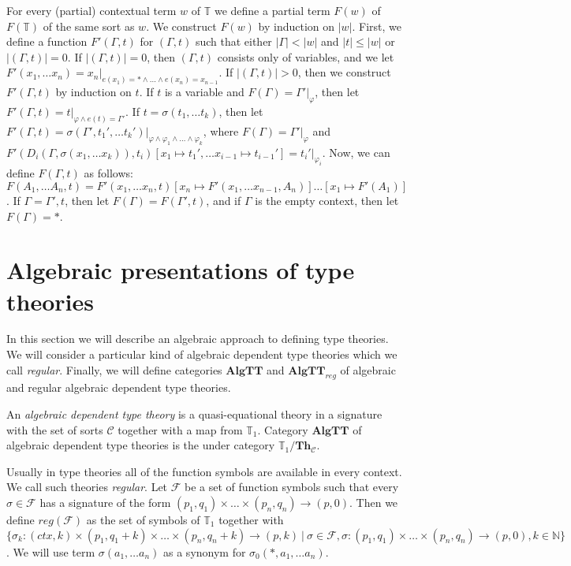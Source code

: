 \documentclass[reqno]{amsart}
\theoremstyle{definition}
\theoremstyle{remark}
\newcommand{\cat}[1]{\mathbf{#1}}
\newcommand{\algtt}{\cat{AlgTT}}
\numberwithin{figure}{section}
\begin{document}
For every (partial) contextual term $w$ of $\mathbb{T}$ we define a partial term $F(w)$ of $F(\mathbb{T})$ of the same sort as $w$.
We construct $F(w)$ by induction on $|w|$.
First, we define a function $F'(\Gamma,t)$ for $(\Gamma,t)$ such that either $|\Gamma| < |w|$ and $|t| \leq |w|$ or $|(\Gamma,t)| = 0$.
If $|(\Gamma,t)| = 0$, then $(\Gamma,t)$ consists only of variables, and we let $F'(x_1, \ldots x_n) = x_n|_{e(x_1) = * \land \ldots \land e(x_n) = x_{n-1}}$.
If $|(\Gamma,t)| > 0$, then we construct $F'(\Gamma,t)$ by induction on $t$.
If $t$ is a variable and $F(\Gamma) = \Gamma'|_\varphi$, then let $F'(\Gamma,t) = t|_{\varphi \land e(t) = \Gamma'}$.
If $t = \sigma(t_1, \ldots t_k)$, then let $F'(\Gamma,t) = \sigma(\Gamma', t_1', \ldots t_k')|_{\varphi \land \varphi_1 \land \ldots \land \varphi_k}$,
    where $F(\Gamma) = \Gamma'|_\varphi$ and $F'(D_i(\Gamma,\sigma(x_1, \ldots x_k)), t_i)[x_1 \mapsto t_1', \ldots x_{i-1} \mapsto t_{i-1}'] = t_i'|_{\varphi_i}$.
Now, we can define $F(\Gamma,t)$ as follows: $F(A_1, \ldots A_n, t) = F'(x_1, \ldots x_n, t)[x_n \mapsto F'(x_1, \ldots x_{n-1}, A_n)] \ldots \allowbreak [x_1 \mapsto F'(A_1)]$.
If $\Gamma = \Gamma',t$, then let $F(\Gamma) = F(\Gamma',t)$, and if $\Gamma$ is the empty context, then let $F(\Gamma) = *$.

\section{Algebraic presentations of type theories}

In this section we will describe an algebraic approach to defining type theories.
We will consider a particular kind of algebraic dependent type theories which we call \emph{regular}.
Finally, we will define categories $\algtt$ and $\algtt_{reg}$ of algebraic and regular algebraic dependent type theories.

\begin{defn}
An \emph{algebraic dependent type theory} is a quasi-equational theory in a signature with the set of sorts $\mathcal{C}$ together with a map from $\mathbb{T}_1$.
Category $\algtt$ of algebraic dependent type theories is the under category $\mathbb{T}_1 / \cat{Th}_\mathcal{C}$.
\end{defn}

Usually in type theories all of the function symbols are available in every context.
We call such theories \emph{regular}.
Let $\mathcal{F}$ be a set of function symbols such that every $\sigma \in \mathcal{F}$ has a signature of the form $(p_1,q_1) \times \ldots \times (p_n,q_n) \to (p,0)$.
Then we define $reg(\mathcal{F})$ as the set of symbols of $\mathbb{T}_1$ together with $\{ \sigma_k : (ctx, k) \times (p_1, q_1 + k) \times \ldots \times (p_n, q_n + k) \to (p, k) \ |\ \sigma \in \mathcal{F}, \sigma : (p_1,q_1) \times \ldots \times (p_n,q_n) \to (p,0), k \in \mathbb{N} \}$.
We will use term $\sigma(a_1, \ldots a_n)$ as a synonym for $\sigma_0(*, a_1, \ldots a_n)$.
\end{document}
